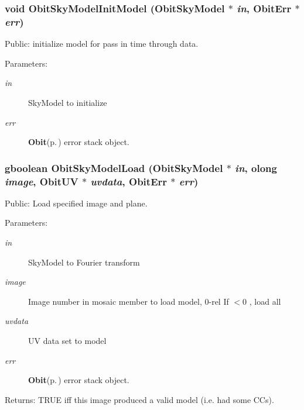 \subsubsection{\setlength{\rightskip}{0pt plus 5cm}void Obit\-Sky\-Model\-Init\-Model ({\bf Obit\-Sky\-Model} $\ast$ {\em in}, {\bf Obit\-Err} $\ast$ {\em err})}\label{ObitSkyModel_8h_a53}


Public: initialize model for pass in time through data. 

\begin{Desc}
\item[Parameters:]
\begin{description}
\item[{\em in}]Sky\-Model to initialize \item[{\em err}]{\bf Obit}{\rm (p.\,\pageref{structObit})} error stack object. \end{description}
\end{Desc}
\subsubsection{\setlength{\rightskip}{0pt plus 5cm}gboolean Obit\-Sky\-Model\-Load ({\bf Obit\-Sky\-Model} $\ast$ {\em in}, {\bf olong} {\em image}, {\bf Obit\-UV} $\ast$ {\em uvdata}, {\bf Obit\-Err} $\ast$ {\em err})}\label{ObitSkyModel_8h_a59}


Public: Load specified image and plane. 

\begin{Desc}
\item[Parameters:]
\begin{description}
\item[{\em in}]Sky\-Model to Fourier transform \item[{\em image}]Image number in mosaic member to load model, 0-rel If $<$0 , load all \item[{\em uvdata}]UV data set to model \item[{\em err}]{\bf Obit}{\rm (p.\,\pageref{structObit})} error stack object. \end{description}
\end{Desc}
\begin{Desc}
\item[Returns:]TRUE iff this image produced a valid model (i.e. had some CCs). \end{Desc}
